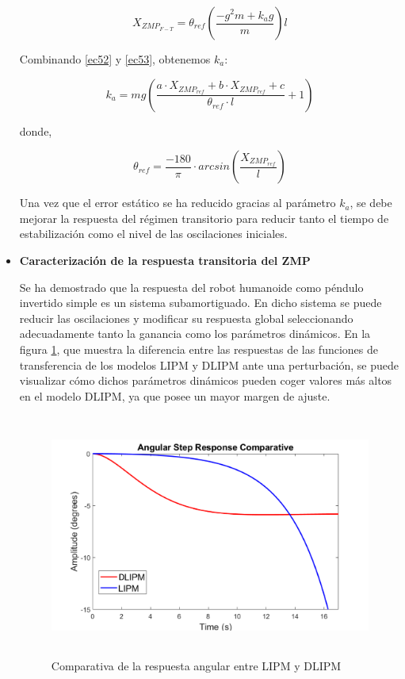 \begin{itemize}
\begin{equation}
X_{ZMP_{F-T}}=\theta_{ref}(\frac{-g^{2}m+k_{a}g}{m})l
\label{ec55}
\end{equation}

Combinando \ref{ec52} y \ref{ec53}, obtenemos $k_a$:

\begin{equation}
k_a=mg(\frac{a \cdot X_{ZMP_{ref}} + b \cdot X_{ZMP_{ref}} + c}{\theta_{ref}\cdot l}+1)
\label{ec56}
\end{equation}

donde,

\begin{equation}
\theta_{ref}=\frac{-180}{\pi}\cdot arcsin(\frac{X_{ZMP_{ref}}}{l})
\label{ec57}
\end{equation}

Una vez que el error estático se ha reducido gracias al parámetro $k_a$, se debe mejorar la respuesta del régimen transitorio para reducir tanto el tiempo de estabilización como el nivel de las oscilaciones iniciales.

\item \textbf{Caracterización de la respuesta transitoria del ZMP}

Se ha demostrado que la respuesta del robot humanoide como péndulo invertido simple es un sistema subamortiguado. En dicho sistema se puede reducir las oscilaciones y modificar su respuesta global seleccionando adecuadamente tanto la ganancia como los parámetros dinámicos. En la figura \ref{figura59}, que muestra la diferencia entre las respuestas de las funciones de transferencia de los modelos LIPM y DLIPM ante una perturbación, se puede visualizar cómo dichos parámetros dinámicos pueden coger valores más altos en el modelo DLIPM, ya que posee un mayor margen de ajuste. 

\begin{figure}[H]
\centering
\includegraphics[width=13cm, height=8cm]{imagenes/apartado_5/58_comparativa_paso}
\caption{Comparativa de la respuesta angular entre LIPM y DLIPM}
\label{figura59}
\end{figure}


\end{itemize}

